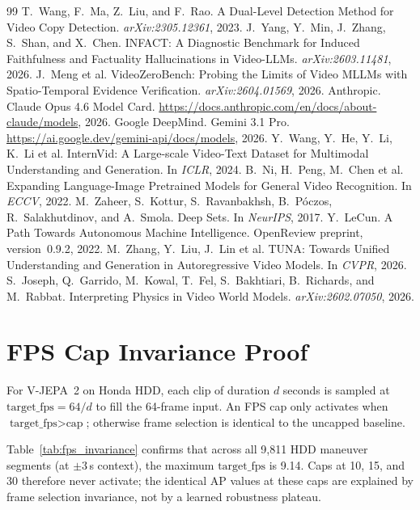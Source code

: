 \documentclass{article}
\theoremstyle{remark}
\begin{document}
\begin{thebibliography}{99}
 T.~Wang, F.~Ma, Z.~Liu, and F.~Rao. A Dual-Level Detection Method for Video Copy Detection. \emph{arXiv:2305.12361}, 2023.
 J.~Yang, Y.~Min, J.~Zhang, S.~Shan, and X.~Chen. INFACT: A Diagnostic Benchmark for Induced Faithfulness and Factuality Hallucinations in Video-LLMs. \emph{arXiv:2603.11481}, 2026.
 J.~Meng et al. VideoZeroBench: Probing the Limits of Video MLLMs with Spatio-Temporal Evidence Verification. \emph{arXiv:2604.01569}, 2026.
 Anthropic. Claude Opus 4.6 Model Card. \url{https://docs.anthropic.com/en/docs/about-claude/models}, 2026.
 Google DeepMind. Gemini 3.1 Pro. \url{https://ai.google.dev/gemini-api/docs/models}, 2026.
 Y.~Wang, Y.~He, Y.~Li, K.~Li et al. InternVid: A Large-scale Video-Text Dataset for Multimodal Understanding and Generation. In \emph{ICLR}, 2024.
 B.~Ni, H.~Peng, M.~Chen et al. Expanding Language-Image Pretrained Models for General Video Recognition. In \emph{ECCV}, 2022.
 M.~Zaheer, S.~Kottur, S.~Ravanbakhsh, B.~P\'{o}czos, R.~Salakhutdinov, and A.~Smola. Deep Sets. In \emph{NeurIPS}, 2017.
 Y.~LeCun. A Path Towards Autonomous Machine Intelligence. OpenReview preprint, version~0.9.2, 2022.
 M.~Zhang, Y.~Liu, J.~Lin et al. TUNA: Towards Unified Understanding and Generation in Autoregressive Video Models. In \emph{CVPR}, 2026.
 S.~Joseph, Q.~Garrido, M.~Kowal, T.~Fel, S.~Bakhtiari, B.~Richards, and M.~Rabbat. Interpreting Physics in Video World Models. \emph{arXiv:2602.07050}, 2026.
\end{thebibliography}

\ifdefined\neuripssubmission
  \newpage
  
\fi

\appendix

\section{FPS Cap Invariance Proof}
\label{sec:fps_invariance}

For V-JEPA~2 on Honda HDD, each clip of duration $d$ seconds is sampled at $\text{target\_fps} = 64 / d$ to fill the 64-frame input. An FPS cap only activates when $\text{target\_fps} > \text{cap}$; otherwise frame selection is identical to the uncapped baseline.

Table~\ref{tab:fps_invariance} confirms that across all 9{,}811 HDD maneuver segments (at $\pm$3\,s context), the maximum $\text{target\_fps}$ is 9.14. Caps at 10, 15, and 30 therefore never activate; the identical AP values at these caps are explained by frame selection invariance, not by a learned robustness plateau.
\end{document}
